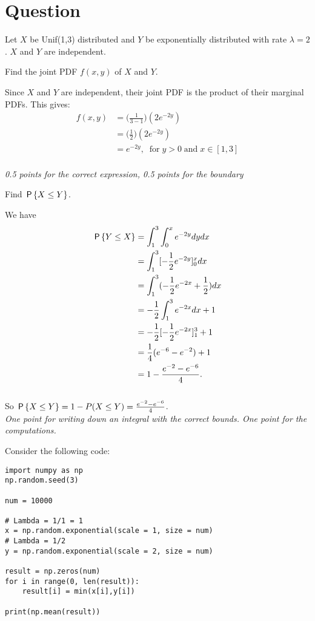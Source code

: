 \section*{Question}


Let $X$ be Unif(1,3) distributed and $Y$ be exponentially distributed with rate $\lambda = 2$. $X$ and $Y$ are independent.
\begin{exercise}[1]
Find the joint PDF $f(x,y)$ of $X$ and $Y$.
\begin{solution}
    Since $X$ and $Y$ are independent, their joint PDF is the product of their marginal PDFs. This gives:
    \begin{align*}
        f(x,y) &= \Big(\frac{1}{3-1}\Big)(2e^{-2y}) \\
        &= \Big(\frac{1}{2}\Big)(2e^{-2y}) \\
        &= e^{-2y}, \; \; \text{for} \; y > 0 \; \text{and} \; x \in [1,3]
    \end{align*} \\
    \textit{0.5 points for the correct expression, 0.5 points for the boundary}
\end{solution}
\end{exercise}

\begin{exercise}[2]
Find $\P{X \leq Y}$.
\begin{solution}
    We have
    \begin{align*}
        \P{Y \leq X} &= \int_1^3 \int_0^x e^{-2y} dy dx \\
        &= \int_1^3 [-\frac{1}{2} e^{-2y} ]_0^x dx \\
        &= \int_1^3 (-\frac{1}{2} e^{-2x} + \frac{1}{2}) dx \\
        &= -\frac{1}{2}  \int_1^3 e^{-2x} dx + 1 \\
        &= -\frac{1}{2}  [ -\frac{1}{2} e^{-2x} ]_1^3 + 1 \\
        &= \frac{1}{4} (e^{-6} - e^{-2}) + 1 \\
        &= 1 - \frac{e^{-2} - e^{-6}}{4}.
    \end{align*}\\
    So $\P{X \leq Y} = 1 - P(X \leq Y) = \frac{e^{-2} - e^{-6}}{4}$.\\
\textit{One point for writing down an integral with the correct bounds. One point for the computations.}
\end{solution}
\end{exercise}
\noindent Consider the following code:
\begin{verbatim}
import numpy as np
np.random.seed(3)

num = 10000

# Lambda = 1/1 = 1
x = np.random.exponential(scale = 1, size = num)
# Lambda = 1/2
y = np.random.exponential(scale = 2, size = num)

result = np.zeros(num)
for i in range(0, len(result)):
    result[i] = min(x[i],y[i])

print(np.mean(result))
\end{verbatim}

